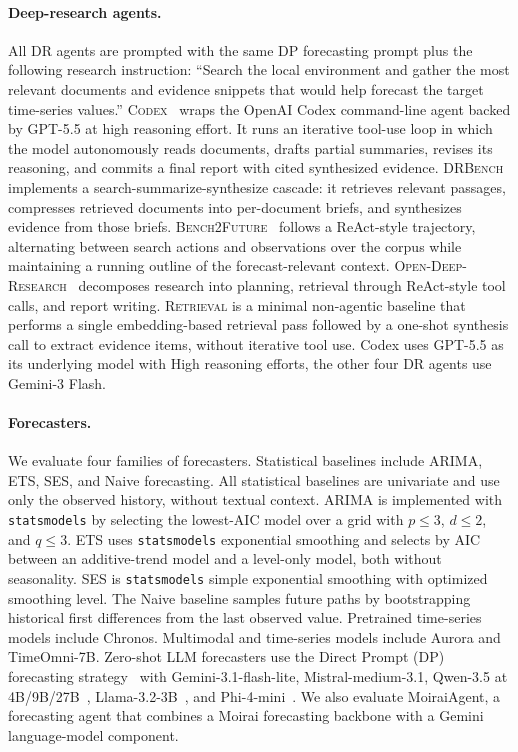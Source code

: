 \documentclass[]{servicenow}
\begin{document}
\paragraph{Deep-research agents.}
All DR agents are prompted with the same DP forecasting prompt plus the following research instruction: ``Search the local environment and gather the most relevant documents and evidence snippets that would help forecast the target time-series values.''
\textsc{Codex}~\citep{openai_codex_2026} wraps the OpenAI Codex command-line agent backed by GPT-5.5 at high reasoning effort.
It runs an iterative tool-use loop in which the model autonomously reads documents, drafts partial summaries, revises its reasoning, and commits a final report with cited synthesized evidence.
\textsc{DRBench}~\citep{abaskohi2025drbench} implements a search-summarize-synthesize cascade: it retrieves relevant passages, compresses retrieved documents into per-document briefs, and synthesizes evidence from those briefs.
\textsc{Bench2Future}~\citep{wildman2025bench} follows a ReAct-style trajectory, alternating between search actions and observations over the corpus while maintaining a running outline of the forecast-relevant context.
\textsc{Open-Deep-Research}~\citep{langchain_open_deep_research} decomposes research into planning, retrieval through ReAct-style tool calls, and report writing.
\textsc{Retrieval} is a minimal non-agentic baseline that performs a single embedding-based retrieval pass followed by a one-shot synthesis call to extract evidence items, without iterative tool use.
Codex uses GPT-5.5 as its underlying model with High reasoning efforts, the other four DR agents use Gemini-3 Flash.

\paragraph{Forecasters.}
We evaluate four families of forecasters.
Statistical baselines include ARIMA, ETS, SES, and Naive forecasting.
All statistical baselines are univariate and use only the observed history, without textual context. ARIMA is implemented with \texttt{statsmodels} by selecting the lowest-AIC model over a grid with $p \leq 3$, $d \leq 2$, and $q \leq 3$. ETS uses \texttt{statsmodels} exponential smoothing and selects by AIC between an additive-trend model and a level-only model, both without seasonality. SES is \texttt{statsmodels} simple exponential smoothing with optimized smoothing level. The Naive baseline samples future paths by bootstrapping historical first differences from the last observed value.
Pretrained time-series models include Chronos.
Multimodal and time-series models include Aurora and TimeOmni-7B.
Zero-shot LLM forecasters use the Direct Prompt (DP) forecasting strategy~\citep{williams2024context} with Gemini-3.1-flash-lite, Mistral-medium-3.1, Qwen-3.5 at 4B/9B/27B~\citep{qwen3.5}, Llama-3.2-3B~\citep{grattafiori2024llama}, and Phi-4-mini~\citep{abdin2024phi}.
We also evaluate MoiraiAgent, a forecasting agent that combines a Moirai forecasting backbone with a Gemini language-model component.
\end{document}
